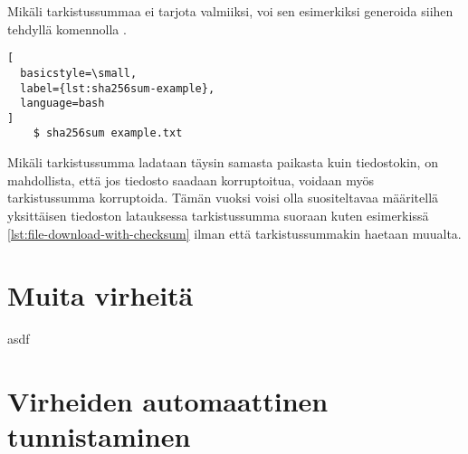 

Mikäli tarkistussummaa ei tarjota valmiiksi, voi sen esimerkiksi generoida siihen tehdyllä
komennolla \parencite{Sha256sumManPage}.

\begin{lstlisting}[
  basicstyle=\small,
  label={lst:sha256sum-example},
  language=bash
]
    $ sha256sum example.txt
\end{lstlisting}

Mikäli tarkistussumma ladataan täysin samasta paikasta kuin tiedostokin, on mahdollista, että
jos tiedosto saadaan korruptoitua, voidaan myös tarkistussumma korruptoida. Tämän vuoksi voisi
olla suositeltavaa määritellä yksittäisen tiedoston latauksessa tarkistussumma suoraan kuten
esimerkissä \ref{lst:file-download-with-checksum} ilman että tarkistussummakin haetaan muualta.

\section{Muita virheitä}

asdf

\section{Virheiden automaattinen tunnistaminen}
